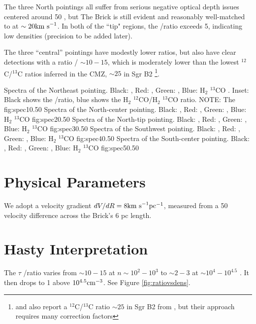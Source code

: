 The three North pointings all suffer from serious negative optical depth issues centered
around 50 \kms, but The Brick is still evident and reasonably well-matched to \ammonia
at $\sim20 \textrm{km~s}^{-1}$.  In both of the ``tip" regions, the \oneone/\twotwo ratio exceeds 5, indicating
low densities (precision to be added later).

The three ``central'' pointings have modestly lower ratios, but also have clear
\formaldehydeIso detections with a ratio \formaldehyde/\formaldehydeIso
$\sim10-15$, which is moderately lower than the lowest $^{12}$C/$^{13}$C ratios
inferred in the CMZ, $\sim25$ in Sgr B2
\citep{Langer1990a,Savage1992a}\footnote{\citet{Henkel1982a} and
\citet{Henkel1983a} also report a $^{12}$C/$^{13}$C ratio $\sim25$ in Sgr B2
from \formaldehyde, but their approach requires many correction factors}.  

{Spectra of the Northeast pointing.  Black: \formaldehyde \oneone, Red:
\formaldehyde \twotwo, Green: \ammonia, Blue: H$_2$ $^{13}$CO \oneone.
Inset: Black shows the \oneone/\twotwo ratio, blue shows the H$_2$ $^{12}$CO/H$_2$ $^{13}$CO \oneone ratio.
NOTE: The }
{fig:spec1}{0.5}{0}
{Spectra of the North-center pointing.  Black: \formaldehyde \oneone, Red: \formaldehyde \twotwo, Green: \ammonia, Blue: H$_2$ $^{13}$CO \oneone}
{fig:spec2}{0.5}{0}
{Spectra of the North-tip pointing.  Black: \formaldehyde \oneone, Red: \formaldehyde \twotwo, Green: \ammonia, Blue: H$_2$ $^{13}$CO \oneone}
{fig:spec3}{0.5}{0}
{Spectra of the Southwest pointing.  Black: \formaldehyde \oneone, Red: \formaldehyde \twotwo, Green: \ammonia, Blue: H$_2$ $^{13}$CO \oneone}
{fig:spec4}{0.5}{0}
{Spectra of the South-center pointing.  Black: \formaldehyde \oneone, Red: \formaldehyde \twotwo, Green: \ammonia, Blue: H$_2$ $^{13}$CO \oneone}
{fig:spec5}{0.5}{0}

\section{Physical Parameters}
We adopt a velocity gradient $dV/dR = 8 \textrm{km~s}^{-1} \textrm{pc}^{-1}$, measured from a 50 \kms
velocity difference across the Brick's 6 pc length.

\section{Hasty Interpretation}
\label{sec:interp}
The $\tau$ \oneone/\twotwo ratio varies from $\sim10-15$ at $n\sim10^2-10^3$ \percc to
$\sim2-3$ at $\sim10^4-10^{4.5}$ \percc.  It then drops to 1 above $10^{4.5} \textrm{cm}^{-3}$.
See Figure \ref{fig:ratiovsdens}.

